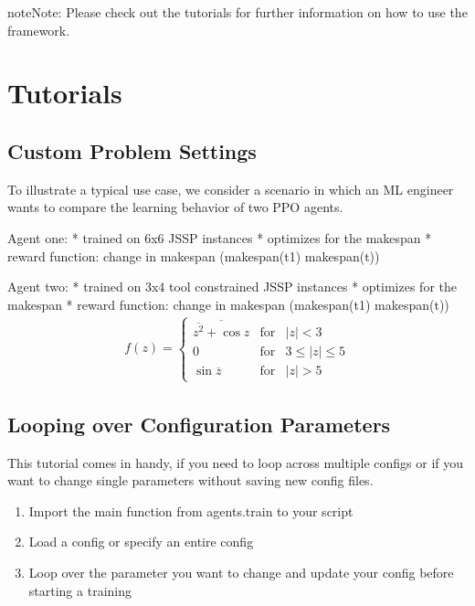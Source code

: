 \documentclass[letterpaper,10pt,english]{sphinxmanual}
\begin{document}
\begin{sphinxadmonition}{note}{Note:}
\sphinxAtStartPar
Please check out the tutorials for further information on how to use the framework.
\end{sphinxadmonition}


\section{Tutorials}
\label{\detokenize{tutorials:tutorials}}\label{\detokenize{tutorials::doc}}

\subsection{Custom Problem Settings}
\label{\detokenize{custom_problem_setting:custom-problem-settings}}\label{\detokenize{custom_problem_setting::doc}}
\sphinxAtStartPar
To illustrate a typical use case, we consider a scenario in which an ML\sphinxhyphen{}
engineer wants to compare the learning behavior of two PPO agents.

\sphinxAtStartPar
Agent one:
* trained on 6x6 JSSP instances
* optimizes for the makespan
* reward function: change in makespan (makespan(t\sphinxhyphen{}1) \sphinxhyphen{} makespan(t))

\sphinxAtStartPar
Agent two:
* trained on 3x4 tool constrained JSSP instances
* optimizes for the makespan
* reward function: change in makespan (makespan(t\sphinxhyphen{}1) \sphinxhyphen{} makespan(t))
\begin{equation*}
\begin{split}f(z) = \left\{ \begin{array}{rcl}
\overline{\overline{z^2}+\cos z} & \mbox{for}
& |z|<3 \\ 0 & \mbox{for} & 3\leq|z|\leq5 \\
\sin\overline{z} & \mbox{for} & |z|>5
\end{array}\right.\end{split}
\end{equation*}

\subsection{Looping over Configuration Parameters}
\label{\detokenize{looping_over_config_params:looping-over-configuration-parameters}}\label{\detokenize{looping_over_config_params::doc}}
\sphinxAtStartPar
This tutorial comes in handy, if you need to loop across multiple configs or if you want to change single parameters
without saving new config files.
\begin{enumerate}
%
\item {} 
\sphinxAtStartPar
Import the main function from agents.train to your script

\item {} 
\sphinxAtStartPar
Load a config or specify an entire config

\item {} 
\sphinxAtStartPar
Loop over the parameter you want to change and update your config before starting a training

\end{enumerate}
\end{document}
